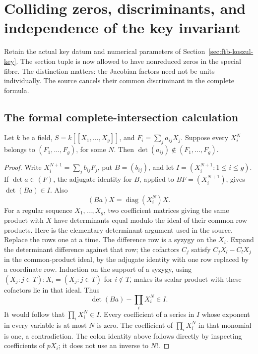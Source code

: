 \section{Colliding zeros, discriminants, and independence of the key invariant}
\label{sec:ftb-key-section-independence}
Retain the actual key datum and numerical parameters of
Section~\ref{sec:ftb-koszul-key}.  The section tuple is now allowed to
have nonreduced zeros in the special fibre.  The distinction matters:
the Jacobian factors need not be units individually.
The source cancels their common discriminant in the complete formula.

\subsection{The formal complete-intersection calculation}
\begin{srlemma}
\label{lem:ftb-socle-determinant}
Let \(k\) be a field, \(S=k[[X_1,\ldots,X_g]]\), and
\(F_i=\sum_j a_{ij}X_j\).  Suppose every \(X_i^N\) belongs to
\((F_1,\ldots,F_g)\), for some \(N\).
Then \(\det(a_{ij})\notin(F_1,\ldots,F_g)\).
\end{srlemma}
\begin{proof}
Write \(X_i^{N+1}=\sum_jb_{ij}F_j\), put \(B=(b_{ij})\),
and let \(I=(X_i^{N+1}:1\leq i\leq g)\).
If \(\det a\in(F)\), the adjugate identity for \(B\), applied to
\(BF=(X_i^{N+1})\), gives \(\det(Ba)\in I\).
Also
\[
 (Ba)X=\operatorname{diag}(X_i^N)X .
\]
For a regular sequence \(X_1,\ldots,X_g\), two coefficient matrices
giving the same product with \(X\) have determinants equal modulo
the ideal of their common row products.  Here is the elementary
determinant argument used in the source.  Replace the rows one at
a time.  The difference row is a syzygy on the \(X_i\).
Expand the determinant difference against that row; the cofactors
\(C_j\) satisfy \(C_jX_l-C_lX_j\) in the common-product ideal,
by the adjugate identity with one row replaced by a coordinate row.
Induction on the support of a syzygy, using
\((X_j:j\in T):X_i=(X_j:j\in T)\) for \(i\notin T\), makes
its scalar product with these cofactors lie in that ideal.
Thus
\[
 \det(Ba)-\prod_iX_i^N\in I .
\]
It would follow that \(\prod_iX_i^N\in I\).
Every coefficient of a series in \(I\) whose exponent in every
variable is at most \(N\) is zero.  The coefficient of
\(\prod_iX_i^N\) in that monomial is one, a contradiction.
The colon identity above follows directly by inspecting coefficients
of \(pX_i\); it does not use an inverse to \(N!\).
\end{proof}

